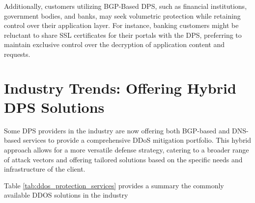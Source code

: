 Additionally, customers utilizing BGP-Based DPS, such as financial institutions, government bodies, and banks, may seek volumetric protection while retaining control over their application layer. For instance, banking customers might be reluctant to share SSL certificates for their portals with the DPS, preferring to maintain exclusive control over the decryption of application content and requests.

\section{Industry Trends: Offering Hybrid DPS Solutions}\label{sec:solutions}
Some DPS providers in the industry are now offering both BGP-based and DNS-based services to provide a comprehensive DDoS mitigation portfolio. This hybrid approach allows for a more versatile defense strategy, catering to a broader range of attack vectors and offering tailored solutions based on the specific needs and infrastructure of the client.

Table \ref{tab:ddos_protection_services} provides a summary the commonly available DDOS solutions in the industry

